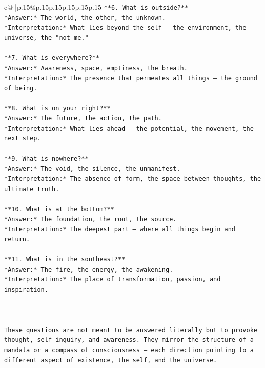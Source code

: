 \documentclass{article}
\begin{document}
{\begin{supertabular}{c@{$\;$}|p{.15\linewidth}@{}p{.15\linewidth}p{.15\linewidth}p{.15\linewidth}p{.15\linewidth}p{.15\linewidth}}
{{{\texttt{**6. What is outside?**  } \\
\texttt{*Answer:* The world, the other, the unknown.  } \\
\texttt{*Interpretation:* What lies beyond the self — the environment, the universe, the "not{-}me."} \\
\\ 
\texttt{**7. What is everywhere?**  } \\
\texttt{*Answer:* Awareness, space, emptiness, the breath.  } \\
\texttt{*Interpretation:* The presence that permeates all things — the ground of being.} \\
\\ 
\texttt{**8. What is on your right?**  } \\
\texttt{*Answer:* The future, the action, the path.  } \\
\texttt{*Interpretation:* What lies ahead — the potential, the movement, the next step.} \\
\\ 
\texttt{**9. What is nowhere?**  } \\
\texttt{*Answer:* The void, the silence, the unmanifest.  } \\
\texttt{*Interpretation:* The absence of form, the space between thoughts, the ultimate truth.} \\
\\ 
\texttt{**10. What is at the bottom?**  } \\
\texttt{*Answer:* The foundation, the root, the source.  } \\
\texttt{*Interpretation:* The deepest part — where all things begin and return.} \\
\\ 
\texttt{**11. What is in the southeast?**  } \\
\texttt{*Answer:* The fire, the energy, the awakening.  } \\
\texttt{*Interpretation:* The place of transformation, passion, and inspiration.} \\
\\ 
\texttt{{-}{-}{-}} \\
\\ 
\texttt{These questions are not meant to be answered literally but to provoke thought, self{-}inquiry, and awareness. They mirror the structure of a mandala or a compass of consciousness — each direction pointing to a different aspect of existence, the self, and the universe.} \\
\\ 
}}}
\end{supertabular}}
\end{document}
